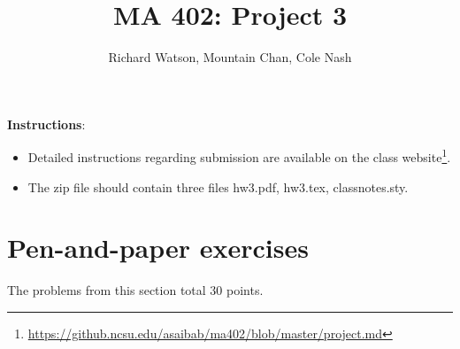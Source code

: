\documentclass[10pt]{exam}
\title{MA 402: Project 3}
\author{Richard Watson, Mountain Chan, Cole Nash}
\begin{document}
\maketitle
\textbf{Instructions}: 

\begin{itemize}
\item Detailed instructions regarding submission are available on the class website\footnote{\url{https://github.ncsu.edu/asaibab/ma402/blob/master/project.md}}.
\item The zip file should contain three files hw3.pdf, hw3.tex, classnotes.sty. 

\end{itemize}

\vspace{2mm}


\section*{Pen-and-paper exercises}
The problems from this section total $30$ points.
\end{document}
